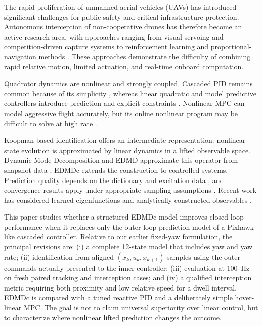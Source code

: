 \documentclass[letterpaper,10pt,conference]{ieeeconf}
\begin{document}
The rapid proliferation of unmanned aerial vehicles (UAVs) has introduced
significant challenges for public safety and critical-infrastructure
protection. Autonomous interception of non-cooperative drones has therefore
become an active research area, with approaches ranging from visual servoing
\cite{yang_autonomous_2020,yang_high-speed_2025} and competition-driven
capture systems \cite{garcia_autonomous_2020} to reinforcement learning
\cite{darwish_drone_2023} and proportional-navigation methods
\cite{pliska_towards_2024}. These approaches demonstrate the difficulty of
combining rapid relative motion, limited actuation, and real-time onboard
computation.

Quadrotor dynamics are nonlinear and strongly coupled. Cascaded PID remains
common because of its simplicity \cite{wang_dynamics_2016}, whereas linear
quadratic and model predictive controllers introduce prediction and explicit
constraints \cite{ahmad_simulation_2020,kouvaritakis_model_2016}. Nonlinear
MPC can model aggressive flight accurately, but its online nonlinear program
may be difficult to solve at high rate
\cite{merabti_nonlinear_2015,magni_nonlinear_2009,schwenzer_review_2021}.

Koopman-based identification offers an intermediate representation: nonlinear
state evolution is approximated by linear dynamics in a lifted observable
space. Dynamic Mode Decomposition and EDMD approximate this operator from
snapshot data \cite{schmid_dynamic_2022,williams_datadriven_2015}; EDMDc
extends the construction to controlled systems. Prediction quality depends on
the dictionary and excitation data \cite{li_extended_2017}, and convergence
results apply under appropriate sampling assumptions
\cite{korda_convergence_2018}. Recent work has considered learned
eigenfunctions \cite{folkestad_extended_2020} and analytically constructed
observables \cite{netto_analytical_2021}.

This paper studies whether a structured EDMDc model improves closed-loop
performance when it replaces only the outer-loop prediction model of a
Pixhawk-like cascaded controller. Relative to our earlier fixed-yaw
formulation, the principal revisions are: (i) a complete 12-state model that
includes yaw and yaw rate; (ii) identification from aligned
$(x_k,u_k,x_{k+1})$ samples using the outer commands actually presented to the
inner controller; (iii) evaluation at 100~Hz on fresh paired tracking and
interception cases; and (iv) a qualified interception metric requiring both
proximity and low relative speed for a dwell interval. EDMDc is compared with
a tuned reactive PID and a deliberately simple hover-linear MPC. The goal is
not to claim universal superiority over linear control, but to characterize
where nonlinear lifted prediction changes the outcome.
\end{document}
